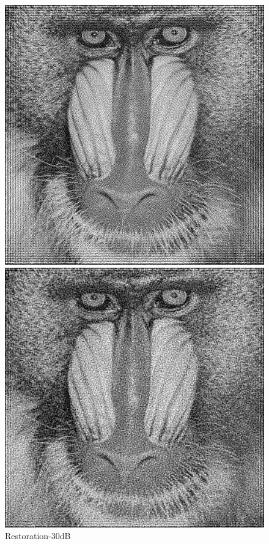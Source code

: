 \documentclass{article}
\begin{document}
\begin{figure}[H]
	\centering
	\begin{minipage}[b]{0.32\linewidth}
		\includegraphics[width=\linewidth,bb=0 0 20cm 20cm]{wnr3.bmp}
		\caption*{Restoration-30dB}
	\end{minipage}
	\begin{minipage}[b]{0.32\linewidth}
		\includegraphics[width=\linewidth,bb=0 0 20cm 20cm]{wnr2.bmp}

\end{minipage}
\end{figure}
\end{document}
